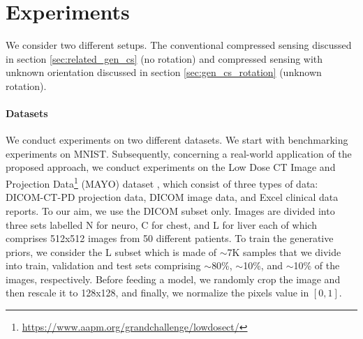 \section{Experiments}\label{sec_equiv:experiments}

We consider two different setups. The conventional compressed sensing discussed in section \ref{sec:related_gen_cs} (no rotation) and compressed sensing with unknown orientation discussed in section \ref{sec:gen_cs_rotation} (unknown rotation).  

\paragraph{Datasets}
We conduct experiments on two different datasets. We start with benchmarking experiments on MNIST. 
Subsequently, concerning a real-world application of the proposed approach, we conduct experiments on the Low Dose CT Image and Projection Data\footnote{\url{https://www.aapm.org/grandchallenge/lowdosect/}} (MAYO) dataset \citep{moen2021low}, which consist of three types of data: DICOM-CT-PD projection data, DICOM image data, and Excel clinical data reports. To our aim, we use the DICOM subset only. Images are divided into three sets labelled N for neuro, C for chest, and L for liver each of which comprises 512x512 images from 50 different patients. To train the generative priors, we consider the L subset which is made of $\sim$7K samples that we divide into train, validation and test sets comprising $\sim$80\%, $\sim$10\%, and $\sim$10\% of the images, respectively.
Before feeding a model, we randomly crop the image and then rescale it to 128x128, and finally, we normalize the pixels value in $[0,1]$.

